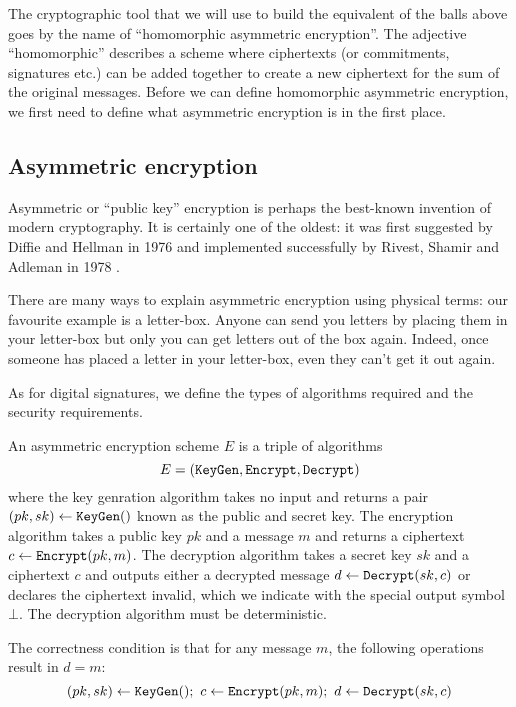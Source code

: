 \documentclass[envcountsame]{llncs}
\newcommand{\alg}[1]{\textup{\texttt{#1}}}
\begin{document}
The cryptographic tool that we will use to build the equivalent of the balls
above goes by the name of ``homomorphic asymmetric encryption''. The adjective
``homomorphic'' describes a scheme where ciphertexts (or commitments, signatures
etc.) can be added together to create a new ciphertext for the sum of the
original messages.
Before we can define homomorphic asymmetric encryption, we first need to define
what asymmetric encryption is in the first place.


\subsection{Asymmetric encryption}

Asymmetric or ``public key'' encryption is perhaps the best-known invention of
modern cryptography. It is certainly one of the oldest: it was first suggested
by Diffie and Hellman in 1976 \cite{DH76} and implemented successfully by
Rivest, Shamir and Adleman in 1978 \cite{RSA78}.

There are many ways to explain asymmetric encryption using physical terms: our
favourite example is a letter-box. Anyone can send you letters by placing them
in your letter-box but only you can get letters out of the box again\footnotemark. Indeed, once someone has placed a letter in your letter-box, even
they can't get it out again.


As for digital signatures, we
define the types of algorithms required and the security requirements.

\begin{definition}
An asymmetric encryption scheme $E$ is a triple of algorithms
\[ E = \left(
\alg{KeyGen}, \alg{Encrypt}, \alg{Decrypt}
\right) \]
where the key genration algorithm takes no input and returns a pair $(pk, sk)
\gets \alg{KeyGen}()$ known as the public and secret key. The encryption
algorithm takes a public key $pk$ and a message $m$ and returns a ciphertext $c
\gets \alg{Encrypt}(pk, m)$. The decryption algorithm takes a secret key $sk$
and a ciphertext $c$ and outputs either a decrypted message $d \gets
\alg{Decrypt}(sk, c)$ or declares the ciphertext invalid, which we indicate with
the special output symbol $\bot$. The decryption algorithm must be deterministic.

The correctness condition is that for any message $m$, the following operations
result in $d = m$:
\[
(pk, sk) \gets \alg{KeyGen}();\ 
c \gets \alg{Encrypt}(pk, m);\ 
d \gets \alg{Decrypt}(sk, c)
\]
\end{definition}
\end{document}
